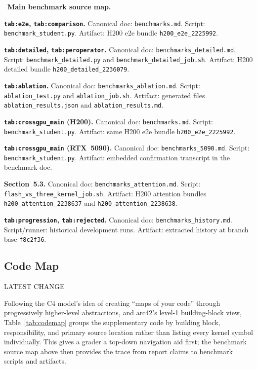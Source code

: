 \documentclass{article}
\newcommand{\latestchglabel}{{\setlength{\fboxsep}{1pt}\colorbox{yellow!65}{\textcolor{black}{\scriptsize LATEST CHANGE}}}}
\newcommand{\latestchgblock}[1]{%
  \begingroup
  \setlength{\fboxsep}{4pt}%
  \colorbox{yellow!20}{%
    \parbox{\dimexpr\linewidth-2\fboxsep\relax}{#1}%
  }%
  \endgroup
}
\begin{document}
{\footnotesize
\noindent\latestchglabel\ \textbf{Main benchmark source map.}

\medskip
\noindent\textbf{\texttt{tab:e2e}, \texttt{tab:comparison}.}
Canonical doc: \texttt{benchmarks.md}.
Script: \texttt{benchmark\_student.py}.
Artifact: H200 e2e bundle \texttt{h200\_e2e\_2225992}.

\medskip
\noindent\textbf{\texttt{tab:detailed}, \texttt{tab:peroperator}.}
Canonical doc: \texttt{benchmarks\_detailed.md}.
Script: \texttt{benchmark\_detailed.py} and \texttt{benchmark\_detailed\_job.sh}.
Artifact: H200 detailed bundle \texttt{h200\_detailed\_2236079}.

\medskip
\noindent\textbf{\texttt{tab:ablation}.}
Canonical doc: \texttt{benchmarks\_ablation.md}.
Script: \texttt{ablation\_test.py} and \texttt{ablation\_job.sh}.
Artifact: generated files \texttt{ablation\_results.json} and \texttt{ablation\_results.md}.

\medskip
\noindent\textbf{\texttt{tab:crossgpu\_main} (H200).}
Canonical doc: \texttt{benchmarks.md}.
Script: \texttt{benchmark\_student.py}.
Artifact: same H200 e2e bundle \texttt{h200\_e2e\_2225992}.

\medskip
\noindent\textbf{\texttt{tab:crossgpu\_main} (RTX~5090).}
Canonical doc: \texttt{benchmarks\_5090.md}.
Script: \texttt{benchmark\_student.py}.
Artifact: embedded confirmation transcript in the benchmark doc.

\medskip
\noindent\textbf{Section~5.3.}
Canonical doc: \texttt{benchmarks\_attention.md}.
Script: \texttt{flash\_vs\_three\_kernel\_job.sh}.
Artifact: H200 attention bundles \texttt{h200\_attention\_2238637} and \texttt{h200\_attention\_2238638}.

\medskip
\noindent\textbf{\texttt{tab:progression}, \texttt{tab:rejected}.}
Canonical doc: \texttt{benchmarks\_history.md}.
Script/runner: historical development runs.
Artifact: extracted history at branch base \texttt{f8c2f36}.
\par}

\subsection{Code Map}

\latestchglabel

\latestchgblock{Following the C4 model's idea of creating ``maps of your code'' through progressively higher-level abstractions, and arc42's level-1 building-block view, Table~\ref{tab:codemap} groups the supplementary code by building block, responsibility, and primary source location rather than listing every kernel symbol individually. This gives a grader a top-down navigation aid first; the benchmark source map above then provides the trace from report claims to benchmark scripts and artifacts.}
\end{document}
